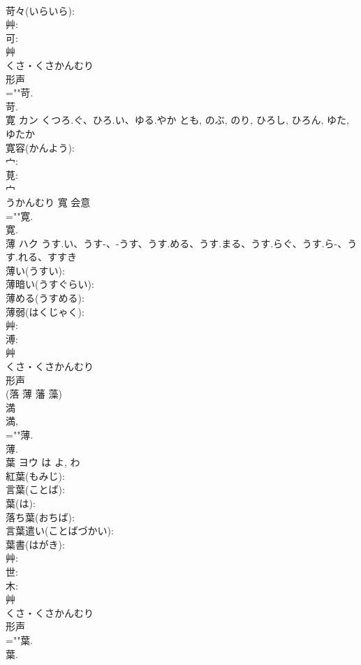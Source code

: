 \documentclass[8pt]{extreport}
\begin{document}
\begin{CJK}{UTF8}{min}
\\	苛々(いらいら): 
\\	艸: 
\\	可: 
\\	艸	
\\	くさ・くさかんむり	
\\	形声 
\\	=""苛.
\\	苛.
\\	寛	カン	くつろ.ぐ、ひろ.い、ゆる.やか	とも, のぶ, のり, ひろし, ひろん, ゆた, ゆたか	
\\	寛容(かんよう): 
\\	宀: 
\\	莧: 
\\	宀	
\\	うかんむり	寬	会意 
\\	=""寛.
\\	寛.
\\	薄	ハク	うす.い、うす-、-うす、うす.める、うす.まる、うす.らぐ、うす.ら-、うす.れる、すすき		
\\	薄い(うすい): 
\\	薄暗い(うすぐらい): 
\\	薄める(うすめる): 
\\	薄弱(はくじゃく): 
\\	艸: 
\\	溥: 
\\	艸	
\\	くさ・くさかんむり	
\\	形声 
\\	(落 薄 藩 藻) 
\\	満 
\\	満, 
\\	=""薄.
\\	薄.
\\	葉	ヨウ	は	よ, わ	
\\	紅葉(もみじ): 
\\	言葉(ことば): 
\\	葉(は): 
\\	落ち葉(おちば): 
\\	言葉遣い(ことばづかい): 
\\	葉書(はがき): 
\\	艸: 
\\	世: 
\\	木: 
\\	艸	
\\	くさ・くさかんむり	
\\	形声 
\\	=""葉.
\\	葉.

\end{CJK}
\end{document}
